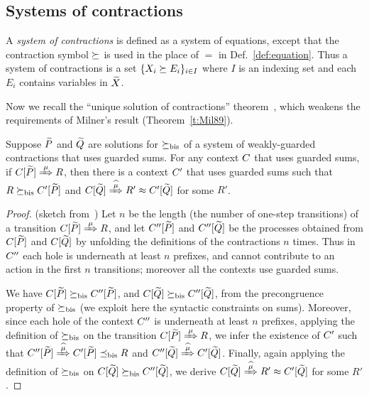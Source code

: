 \subsection{Systems of contractions}
\label{ss:SysContr}

A \emph{system of contractions} is defined as a system of equations,
except that the contraction symbol $\mathrel{\succeq}$ is used in the place of
$=$ in Def.~\ref{def:equation}. Thus a system of contractions is a set 
$\{  X_i \mathrel{\succeq} E_i\}_{i\in I}$ where $I$ is an indexing set and each
$E_i$  contains variables in $\widetilde X$.

Now we recall the ``unique solution of
contractions'' theorem~\cite{sangiorgi2017equations},
which weakens the requirements of Milner's result
(Theorem~\ref{t:Mil89}).

\begin{lemma}
\label{l:uptocon}
Suppose $\widetilde P$ and $\widetilde Q$ are solutions for $\mathrel{\succeq_{\rm{bis}}}$
 of a system of weakly-guarded contractions that uses 
guarded sums.
For any context $C$  that uses guarded sums,
if $\ct{\til P}\Arr{\mu}  R$, then there is a context $C'$  that uses 
guarded sums
such that $R \mathrel{\succeq_{\rm{bis}}} C' [\widetilde P]$ and $\ct{\til Q} \Arcap{\mu} R'
 \wb \ctp{\til Q}$ for some $R'$.
\end{lemma}

\begin{proof}{(sketch from~\cite{sangiorgi2017equations})}
  Let $n$ be the length (the number of one-step transitions) of
a transition $\ct{\til P}\Arr\mu R$, and
let $C'' [\widetilde P]$ and $C'' [\widetilde Q]$  be the processes obtained
from  $C [\widetilde P]$ and $C [\widetilde Q]$ by unfolding the definitions
of the contractions $n$ times. Thus in $C''$ each hole is
underneath at least $n$ prefixes, and cannot contribute to an action
in the first $n$ transitions; moreover all the contexts use guarded sums.

We have $C [\widetilde P] \mathrel{\succeq_{\rm{bis}}} C'' [\widetilde P]$, and 
$C [\widetilde Q] \mathrel{\succeq_{\rm{bis}}} C'' [\widetilde Q]$, 
 from the precongruence property of $\mathrel{\succeq_{\rm{bis}}}$ (we exploit here
 the syntactic constraints on sums). Moreover,
 since each hole of the  context $C''$ is underneath at least $n$
 prefixes, applying the definition
 of $ \mathrel{\succeq_{\rm{bis}}}$ on the transition 
 $\ct{\til P}\Arr{\mu}  R$, we infer the existence
 of $C'$ such that 
$\ctpp{\til P}\Arcap{\mu} \ctp{\til P} \mexpaBIS R$
and 
$\ctpp{\til Q}\Arcap{\mu}  \ctp{\til Q}$.
Finally, again applying the definition of $\mathrel{\succeq_{\rm{bis}}}$ on 
$C [\widetilde Q] \mathrel{\succeq_{\rm{bis}}} C'' [\widetilde Q]$, 
we derive 
$\ct{\til Q}\Arcap{\mu} R' \wb \ctp{\til Q}$ for some $R'$.
\end{proof}

